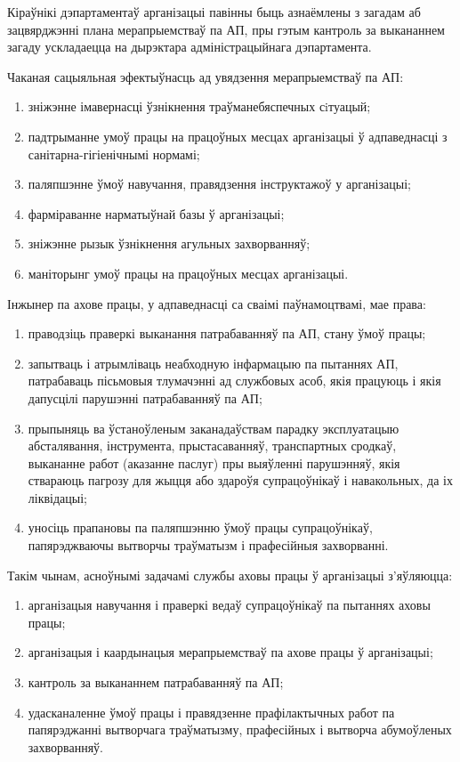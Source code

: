 Кіраўнікі дэпартаментаў арганізацыі павінны быць азнаёмлены з загадам аб зацвярджэнні плана мерапрыемстваў па АП, пры гэтым кантроль за выкананнем загаду ускладаецца на дырэктара адміністрацыйнага дэпартамента.

Чаканая сацыяльная эфектыўнасць ад увядзення мерапрыемстваў па АП:
\begin{enumerate}
    \item зніжэнне імавернасці ўзнікнення траўманебяспечных сiтуацый;
    \item падтрыманне умоў працы на працоўных месцах арганізацыі ў адпаведнасці з санітарна-гігіенічнымі нормамі;
    \item паляпшэнне ўмоў навучання, правядзення інструктажоў у арганізацыі;
    \item фарміраванне нарматыўнай базы ў арганізацыі;
    \item зніжэнне рызык ўзнікнення агульных захворванняў;
    \item маніторынг умоў працы на працоўных месцах арганізацыі.
\end{enumerate}

Інжынер па ахове працы, у адпаведнасці са сваімі паўнамоцтвамі, мае права:
\begin{enumerate}
    \item праводзіць праверкі выканання патрабаванняў па АП, стану ўмоў працы;
    \item запытваць і атрымліваць неабходную інфармацыю па пытаннях АП, патрабаваць пісьмовыя тлумачэнні ад службовых асоб, якія працуюць і якія дапусцілі парушэнні патрабаванняў па АП;
    \item прыпыняць ва ўстаноўленым заканадаўствам парадку эксплуатацыю абсталявання, інструмента, прыстасаванняў, транспартных сродкаў, выкананне работ (аказанне паслуг) пры выяўленні парушэнняў, якія ствараюць пагрозу для жыцця або здароўя супрацоўнікаў і навакольных, да іх ліквідацыі;
    \item уносіць прапановы па паляпшэнню ўмоў працы супрацоўнікаў, папярэджваючы вытворчы траўматызм і прафесійныя захворванні.
\end{enumerate}

Такім чынам, асноўнымі задачамі службы аховы працы ў арганізацыі з'яўляюцца:
\begin{enumerate}
    \item арганізацыя навучання і праверкі ведаў супрацоўнікаў па пытаннях аховы працы;
    \item арганізацыя і каардынацыя мерапрыемстваў па ахове працы ў арганізацыі;
    \item кантроль за выкананнем патрабаванняў па АП;
    \item удасканаленне ўмоў працы і правядзенне прафілактычных работ па папярэджанні вытворчага траўматызму, прафесійных і вытворча абумоўленых захворванняў.
\end{enumerate}
